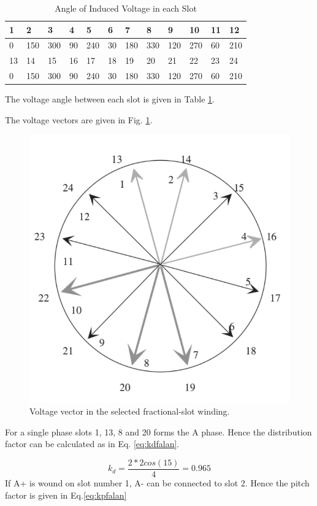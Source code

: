 \documentclass{article}
\begin{document}
\begin{table}[H]
	\caption{Angle of Induced Voltage in each Slot}
	\label{tab:voltageangle20-24}
	\begin{tabular}{llllllllllll}
		1	&  2& 3 &4  & 5 & 6 & 7 & 8 & 9 & 10 & 11 & 12 \\
		\hline
		
		0&	150	&300&	90	&240&	30&	180&	330&	120&	270&	60&	210	\\
		\hline
		13	& 14 & 15 &16  &17  &18  &19  &20  &21  &22  &23  &24 \\
			\hline
		0&	150	&300&	90	&240&	30	&180&	330	&120&	270	&60	&210 
	
	\end{tabular}
\end{table}
The voltage angle between each slot is given in Table \ref{tab:voltageangle20-24}.

The voltage vectors are given in Fig. \ref{fig:voltagefrac}.
\begin{figure}[H]
	\centering
	\includegraphics[width=0.7\linewidth]{Figurler/20p24s}
	\caption{Voltage vector in the selected fractional-slot winding.}
	\label{fig:voltagefrac}
\end{figure}

For a single phase slots 1, 13, 8 and 20 forms the A phase. Hence the distribution factor can be calculated as in Eq. \ref{eq:kdfalan}.

\begin{equation}
	k_d=\frac{2*2cos(15)}{4}=0.965
	\label{eq:kdfalan}
\end{equation}
 If A+ is wound on slot number 1, A- can be connected to slot 2. Hence the pitch factor is given in Eq.\ref{eq:kpfalan}
 
\end{document}
